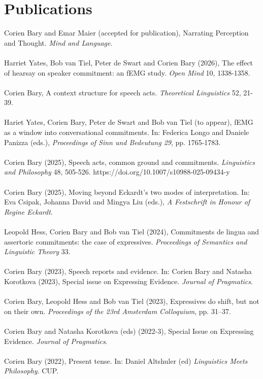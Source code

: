 \documentclass[a4paper,11pt]{article}
\begin{document}
\section*{Publications}
Corien Bary and Emar Maier (accepted for publication), Narrating Perception and Thought. \emph{Mind and Language}.\\\\
Harriet Yates, Bob van Tiel, Peter de Swart and Corien Bary (2026), The effect of hearsay on speaker commitment: an fEMG study. \emph{Open Mind} 10, 1338-1358.\\\\
Corien Bary, A context structure for speech acts. \emph{Theoretical Linguistics} 52, 21-39.\\\\
Hariet Yates, Corien Bary, Peter de Swart and Bob van Tiel (to appear), fEMG as a window into conversational commitments. In: Federica Longo and Daniele Panizza (eds.), \emph{Proceedings of Sinn und Bedeutung 29}, pp. 1765-1783.\\\\ 
Corien Bary (2025), Speech acts, common ground and commitments. \emph{Linguistics and Philosophy} 48, 505-526. https://doi.org/10.1007/s10988-025-09434-y \\\\
Corien Bary (2025), Moving beyond Eckardt's two modes of interpretation. In: Eva Csipak, Johanna David and Mingya Liu (eds.), \emph{A Festschrift in Honour of Regine Eckardt}.\\\\
Leopold Hess, Corien Bary and Bob van Tiel (2024), Commitments de lingua and assertoric commitments: the case of expressives. \emph{Proceedings of Semantics and Linguistic Theory} 33.\\\\
Corien Bary (2023), Speech reports and evidence. In: Corien Bary and Natasha Korotkova (2023), Special issue on Expressing Evidence. \emph{Journal of Pragmatics}.\\\\
Corien Bary, Leopold Hess and Bob van Tiel (2023), Expressives do shift, but not on their own. \emph{Proceedings of the 23rd Amsterdam Colloquium}, pp. 31--37.\\\\
Corien Bary and Natasha Korotkova (eds) (2022-3), Special Issue on Expressing Evidence. \emph{Journal of Pragmatics}.\\\\
Corien Bary (2022), Present tense. In: Daniel Altshuler (ed) \emph{Linguistics Meets Philosophy}. CUP.\\\\
\end{document}
